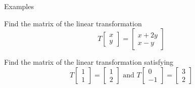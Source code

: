 \documentclass{beamer}
\begin{document}
\begin{frame}{Examples}
\begin{example}
Find the matrix of the linear transformation
\begin{equation*}
T \left[
\begin{array}{c}
x\\
y
\end{array}
\right] = \left[
\begin{array}{c}
x+2y\\
x-y
\end{array}
\right]
\end{equation*}
\end{example}
\begin{example}
Find the matrix of the linear transformation satisfying
\begin{equation*}
T \left[
\begin{array}{c}
1\\
1
\end{array}
\right] = \left[
\begin{array}{c}
1\\
2
\end{array}
\right]\text{ and } T \left[
\begin{array}{c}
0\\
-1
\end{array}
\right] = \left[
\begin{array}{c}
3\\
2
\end{array}
\right]
\end{equation*}
\end{example}
\end{frame}
\end{document}
